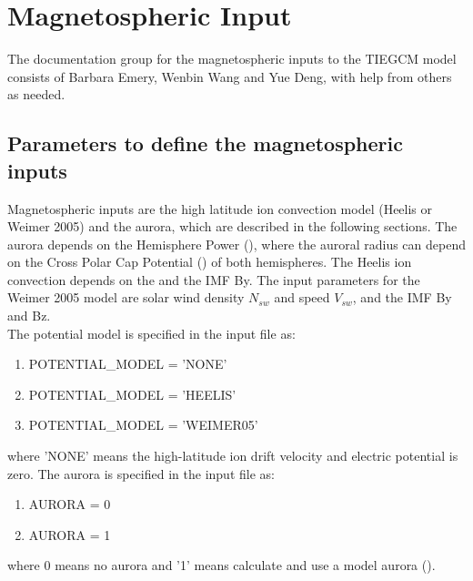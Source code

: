 %
\section{Magnetospheric Input} \label{cap:magneto_input}
%
The documentation group for the magnetospheric inputs to the TIEGCM model 
consists of Barbara Emery, Wenbin Wang and Yue Deng, with help from others 
as needed.
%
\subsection{Parameters to define the magnetospheric inputs}\label{cap:maginput}
% 
Magnetospheric inputs are the high latitude ion convection model (Heelis or
Weimer 2005) and the aurora, which are described in the following sections.
The aurora depends on the Hemisphere Power (),
where the auroral radius can depend  on the Cross Polar Cap
Potential () of both hemispheres.  The Heelis ion convection \cite{heelis1982}
depends on the  and the IMF By.
The input parameters for the Weimer 2005 model \cite{weimer2005}
are solar wind density $N_{sw}$ and speed $V_{sw}$, and the IMF By and Bz. \\

The potential model is specified in the input file as:
%
\begin{enumerate}
\item POTENTIAL\_MODEL = 'NONE' 
\item POTENTIAL\_MODEL = 'HEELIS' 
\item POTENTIAL\_MODEL = 'WEIMER05' 
\end{enumerate}

where 'NONE' means the high-latitude ion drift velocity and electric potential
is zero.  The aurora is specified in the input file as:
%
\begin{enumerate}
\item AURORA = 0
\item AURORA = 1
\end{enumerate}

where 0 means no aurora and '1' means calculate and use a model aurora
(\cite{roble1987}). \\

